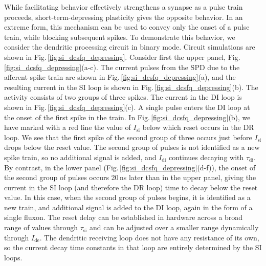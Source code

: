 \documentclass[twocolumn]{article}
\begin{document}
While facilitating behavior effectively strengthens a synapse as a pulse train proceeds, short-term-depressing plasticity gives the opposite behavior. In an extreme form, this mechanism can be used to convey only the onset of a pulse train, while blocking subsequent spikes. To demonstrate this behavior, we consider the dendritic processing circuit in binary mode. Circuit simulations are shown in Fig.\,\ref{fig:si_dcsfq_depressing}. Consider first the upper panel, Fig.\,\ref{fig:si_dcsfq_depressing}(a-c). The current pulses from the SPD due to the afferent spike train are shown in Fig.\,\ref{fig:si_dcsfq_depressing}(a), and the resulting current in the SI loop is shown in Fig.\,\ref{fig:si_dcsfq_depressing}(b). The activity consists of two groups of three spikes. The current in the DI loop is shown in Fig.\,\ref{fig:si_dcsfq_depressing}(c). A single pulse enters the DI loop at the onset of the first spike in the train. In Fig.\,\ref{fig:si_dcsfq_depressing}(b), we have marked with a red line the value of $I_{\mathrm{si}}$ below which reset occurs in the DR loop. We see that the first spike of the second group of three occurs just before $I_{\mathrm{si}}$ drops below the reset value. The second group of pulses is not identified as a new spike train, so no additional signal is added, and $I_{\mathrm{di}}$ continues decaying with $\tau_{\mathrm{di}}$. By contrast, in the lower panel (Fig.\,\ref{fig:si_dcsfq_depressing}(d-f)), the onset of the second group of pulses occurs 20\,ns later than in the upper panel, giving the current in the SI loop (and therefore the DR loop) time to decay below the reset value. In this case, when the second group of pulses begins, it is identified as a new train, and additional signal is added to the DI loop, again in the form of a single fluxon. The reset delay can be established in hardware across a broad range of values through $\tau_{\mathrm{si}}$ and can be adjusted over a smaller range dynamically through $I_{\mathrm{de}}$. The dendritic receiving loop does not have any resistance of its own, so the current decay time constants in that loop are entirely determined by the SI loops. 
\end{document}

